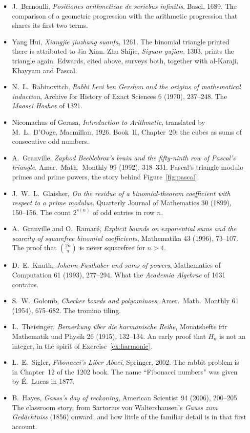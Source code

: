 \begin{itemize}
\item J.~Bernoulli, \emph{Positiones arithmeticae de seriebus infinitis}, Basel, 1689. The comparison of a geometric progression with the arithmetic progression that shares its first two terms.
\item Yang Hui, \emph{Xiangjie jiuzhang suanfa}, 1261. The binomial triangle printed there is attributed to Jia Xian. Zhu Shijie, \emph{Siyuan yujian}, 1303, prints the triangle again. Edwards, cited above, surveys both, together with al-Karaji, Khayyam and Pascal.
\item N.~L.~Rabinovitch, \emph{Rabbi Levi ben Gershon and the origins of mathematical induction}, Archive for History of Exact Sciences 6 (1970), 237--248. The \emph{Maasei Hoshev} of 1321.
\item Nicomachus of Gerasa, \emph{Introduction to Arithmetic}, translated by M.~L.~D'Ooge, Macmillan, 1926. Book~II, Chapter~20: the cubes as sums of consecutive odd numbers.
\item A.~Granville, \emph{Zaphod Beeblebrox's brain and the fifty-ninth row of Pascal's triangle}, Amer.\ Math.\ Monthly 99 (1992), 318--331. Pascal's triangle modulo primes and prime powers, the story behind Figure~\ref{fig:pascal}.
\item J.~W.~L.~Glaisher, \emph{On the residue of a binomial-theorem coefficient with respect to a prime modulus}, Quarterly Journal of Mathematics 30 (1899), 150--156. The count $2^{s(n)}$ of odd entries in row $n$.
\item A.~Granville and O.~Ramar\'e, \emph{Explicit bounds on exponential sums and the scarcity of squarefree binomial coefficients}, Mathematika 43 (1996), 73--107. The proof that $\binom{2n}n$ is never squarefree for $n>4$.
\item D.~E.~Knuth, \emph{Johann Faulhaber and sums of powers}, Mathematics of Computation 61 (1993), 277--294. What the \emph{Academia Algebrae} of 1631 contains.
\item S.~W.~Golomb, \emph{Checker boards and polyominoes}, Amer.\ Math.\ Monthly 61 (1954), 675--682. The tromino tiling.
\item L.~Theisinger, \emph{Bemerkung \"uber die harmonische Reihe}, Monatshefte f\"ur Mathematik und Physik 26 (1915), 132--134. An early proof that $H_n$ is not an integer, in the spirit of Exercise~\ref{ex:harmonic}.
\item L.~E.~Sigler, \emph{Fibonacci's Liber Abaci}, Springer, 2002. The rabbit problem is in Chapter~12 of the 1202 book. The name ``Fibonacci numbers'' was given by \'E.~Lucas in 1877.
\item B.~Hayes, \emph{Gauss's day of reckoning}, American Scientist 94 (2006), 200--205. The classroom story, from Sartorius von Waltershausen's \emph{Gauss zum Ged\"achtniss} (1856) onward, and how little of the familiar detail is in that first account.
\end{itemize}
